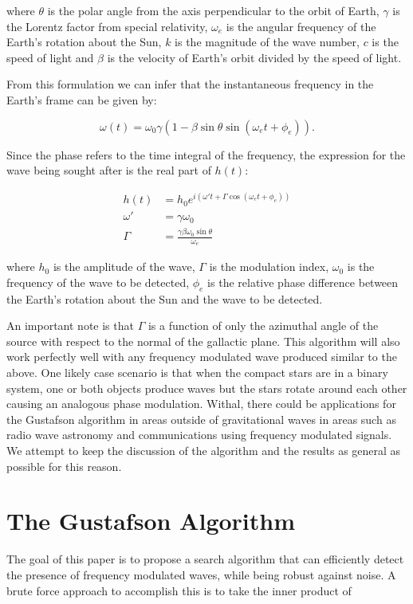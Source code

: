 \documentclass[onecolumn, groupedaddress, 10pt]{revtex4-1}
\begin{document}
where $\theta$ is the polar angle from the axis perpendicular to the orbit of Earth, $\gamma$ is the Lorentz factor from special relativity, $\omega_e$ is the angular frequency of the Earth's rotation about the Sun, $k$ is the magnitude of the wave number, $c$ is the speed of light and $\beta$ is the velocity of Earth's orbit divided by the speed of light.

From this formulation we can infer that the instantaneous frequency in the Earth's frame can be given by:

\begin{equation}
\omega (t) = \omega_0 \gamma \left( 1 - \beta \sin \theta \sin (\omega_e t + \phi_e) \right). 
\end{equation}

Since the phase refers to the time integral of the frequency, the expression for the wave being sought after is the real part of $h(t)$: 

\begin{align}
h(t)    &= h_0 e^{i \left( \omega' t + \Gamma \cos (\omega_e t + \phi_e) \right)}		\\
\omega' &= \gamma \omega_0															\\
\Gamma  &= \frac{\gamma \beta \omega_0 \sin \theta}{\omega_e}
\end{align}


where $h_0$ is the amplitude of the wave, $\Gamma$ is the modulation index, $\omega_0$ is the frequency of the wave to be detected, $\phi_e$ is the relative phase difference between the Earth's rotation about the Sun and the wave to be detected.

An important note is that $\Gamma$ is a function of only the azimuthal angle of the source with respect to the normal of the gallactic plane. This algorithm will also work perfectly well with any frequency modulated wave produced similar to the above. One likely case scenario is that when the compact stars are in a binary system, one or both objects produce waves but the stars rotate around each other causing an analogous phase modulation.  Withal, there could be applications for the Gustafson algorithm in areas outside of gravitational waves in areas such as radio wave astronomy and communications using frequency modulated signals. We attempt to keep the discussion of the algorithm and the results as general as possible for this reason.

\section{The Gustafson Algorithm}
The goal of this paper is to propose a search algorithm that can efficiently detect the presence of frequency modulated waves, while being robust against noise.  A brute force approach to accomplish this is to take the inner product of 
\end{document}
